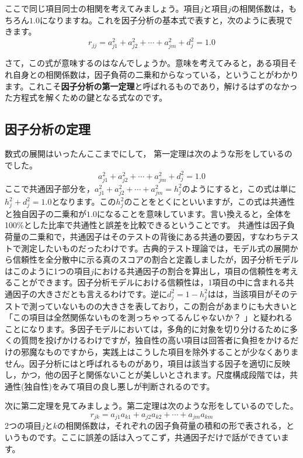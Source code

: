 \documentclass{ltjsbook}
\begin{document}
ここで同じ項目同士の相関を考えてみましょう。項目$j$と項目$j$の相関係数は，もちろん$1.0$になりますね。これを因子分析の基本式で表すと，次のように表現できます。
\begin{equation}
	\label{facteo1}
	r_{jj}=a_{j1}^2+a_{j2}^2+ \cdots + a_{jm}^2 + d_j^2 = 1.0
\end{equation}

さて，この式が意味するのはなんでしょうか。意味を考えてみると，ある項目それ自身との相関係数は，因子負荷の二乗和からなっている，ということがわかります。これこそ\textbf{因子分析の第一定理}と呼ばれるものであり，解けるはずのなかった方程式を解くための鍵となる式なのです。

\subsection{因子分析の定理}
数式の展開はいったんここまでにして，
第一定理は次のような形をしているのでした。
\[a_{j1}^2+a_{j2}^2+ \cdots + a_{jm}^2 + d_j^2 = 1.0 \]
ここで共通因子部分を，$a_{j1}^2+a_{j2}^2+ \cdots + a_{jm}^2=h_j^2$のようにすると，この式は単に$h_j^2 + d_j^2 = 1.0$となります。この$h_j^2$のことをとくにといいますが，この式は共通性と独自因子の二乗和が$1.0$になることを意味しています。言い換えると，全体を100\%とした比率で共通性と誤差を比較できるということです。
共通性は因子負荷量の二乗和で，共通因子はそのテストの背後にある共通の要因，すなわちテストで測定したいものだったわけです。古典的テスト理論では，モデル式の展開から信頼性を全分散中に示る真のスコアの割合と定義しましたが，因子分析モデルはこのように1つの項目$j$における共通因子の割合を算出し，項目の信頼性を考えることができます。因子分析モデルにおける信頼性は，1項目の中に含まれる共通因子の大きさだとも言えるわけです。逆に$d_j^2=1-h_j^2$はは，当該項目がそのテストで測っていないものの大きさを表しており，この割合があまりにも大きいと「この項目は全然関係ないものを測っちゃってるんじゃないか？ 」と疑われることになります。多因子モデルにおいては，多角的に対象を切り分けるために多くの質問を投げかけるわけですが，独自性の高い項目は回答者に負担をかけるだけの邪魔なものですから，実践上はこうした項目を除外することが少なくありません。因子分析にはと呼ばれるものがあり，項目は該当する因子を適切に反映し，かつ，他の因子と関係ないことが美しいとされます。尺度構成段階では，共通性(独自性)をみて項目の良し悪しが判断されるのです。

次に第二定理を見てみましょう。第二定理は次のような形をしているのでした。
\[  r_{jk}=a_{j1}a_{k1}+a_{j2}a_{k2}+ \cdots +a_{jm}a_{km} \]
2つの項目$j$と$k$の相関係数は，それぞれの因子負荷量の積和の形で表される，というものです。ここに誤差の話は入ってこず，共通因子だけで話ができています。
\end{document}
